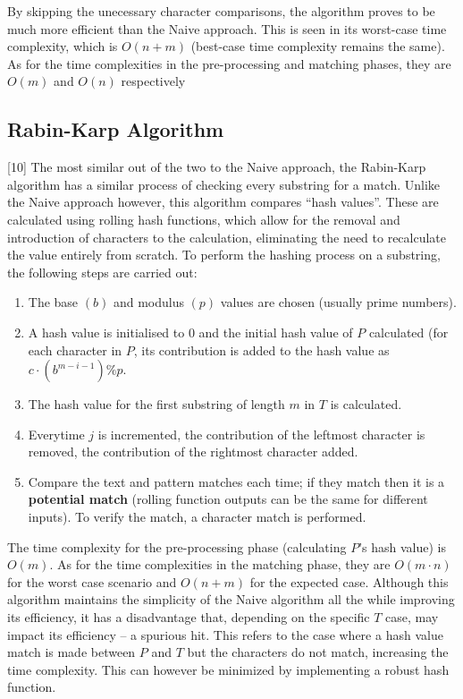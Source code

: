 \documentclass[12pt]{article}
\begin{document}
By skipping the unecessary character comparisons, the algorithm proves to be much
more efficient than the Naive approach. This is seen in its worst-case time complexity,
which is $O(n + m)$ (best-case time complexity remains the same). As for the time complexities in the pre-processing and matching phases, they are $O(m)$ and $O(n)$ respectively

\subsection{Rabin-Karp Algorithm}

[10] The most similar out of the two to the Naive approach, the Rabin-Karp algorithm
has a similar process of checking every substring for a match. Unlike the Naive approach
however, this algorithm compares “hash values”. These are calculated using rolling hash
functions, which allow for the removal and introduction of characters to the calculation,
eliminating the need to recalculate the value entirely from scratch. To perform the hashing
process on a substring, the following steps are carried out:

\begin{question}
\begin{enumerate}
	\item The base $(b)$ and modulus $(p)$ values are chosen (usually prime numbers).
	\item A hash value is initialised to 0 and the initial hash value of $P$ calculated (for each character in $P$, its contribution is added to the hash value as $c \cdot (b^{m-i-1}) \% p$.
	\item The hash value for the first substring of length $m$ in $T$ is calculated.
	\item Everytime $j$ is incremented, the contribution of the leftmost character is removed, the contribution of the rightmost character added.
	\item Compare the text and pattern matches each time; if they match then it is a \textbf{potential match} (rolling function outputs can be the same for different inputs). To verify the match, a character match is performed.
	
\end{enumerate}
\end{question}

The time complexity for the pre-processing phase (calculating $P$'s hash value) is $O(m)$.
As for the time complexities in the matching phase, they are $O(m \cdot n)$ for the worst case
scenario and $O(n + m)$ for the expected case. Although this algorithm maintains the
simplicity of the Naive algorithm all the while improving its efficiency, it has a disadvantage that, depending on the specific $T$ case, may impact its efficiency -- a spurious
hit. This refers to the case where a hash value match is made between $P$ and $T$ but the
characters do not match, increasing the time complexity. This can however be minimized
by implementing a robust hash function.
\end{document}
